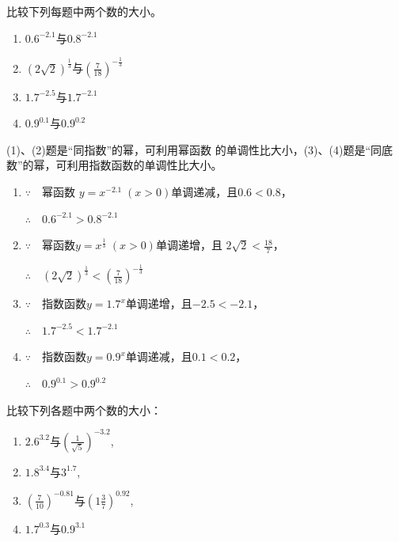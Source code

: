  \begin{example}
     比较下列每题中两个数的大小。
 \begin{multicols}{2}
 \begin{enumerate}[(1)]
     \item $0.6^{-2.1}$与$0.8^{- 2.1}$
     \item $( 2\sqrt 2) ^{\tfrac 13}$与$\left(\frac7{18}\right)^{-\tfrac{1}{3}}$
     \item $1.7^{-2.5}$与$1.7^{-2.1}$
     \item $0.9^{0.1}$与$0.9^{0.2}$
 \end{enumerate}
 \end{multicols}
 \end{example}
 
 \begin{analyze}
     (1)、(2)题是“同指数”的幂，可利用幂函数
 的单调性比大小，(3)、(4)题是“同底数”的幂，可利用指数函数的单调性比大小。
 \end{analyze}
 
 \begin{solution}
 \begin{enumerate}[(1)]
     \item $\because \quad $幂函数 $y=x^{-2.1}\; (x>0)$单调递减，且$0.6<0.8$，
     
 $\therefore\quad 0.6^{-2.1}>0.8^{-2.1}$    
 
 \item $\because\quad $幂函数$y=x^{\tfrac13}\; (x>0)$单调递增，且
 $2\sqrt{2}<\frac{18}{7}$，
 
 $\therefore\quad ( 2\sqrt 2) ^{\tfrac 13}<\left(\frac7{18}\right)^{-\tfrac{1}{3}}$
 
 \item $\because \quad $指数函数$y=1.7^x$单调递增，且$-2.5<-2.1$，
 
 $\therefore\quad 1.7^{-2.5}<1.7^{-2.1}$
 
 \item $\because \quad $指数函数$y=0.9^x$单调递减，且$0.1<0.2$，
 
 $\therefore\quad 0.9^{0.1}>0.9^{0.2}$
 \end{enumerate}
 \end{solution}
 
 \begin{example}
     比较下列各题中两个数的大小：
 \begin{multicols}{2}
 \begin{enumerate}[(1)]
     \item $2.6^{3.2}$与$\left ( \frac 1{\sqrt {5}}\right ) ^{- 3.2} $, 
     \item $1.8^{3.4}$与$3^{1.7}$,
     \item $\left(\frac7{10}\right)^{-0.81}$与$\left(1\frac37\right)^{0.92}$,
     \item $1.7^{0.3}$与$0.9^{3.1}$
 \end{enumerate}
 \end{multicols}
 \end{example}
 
